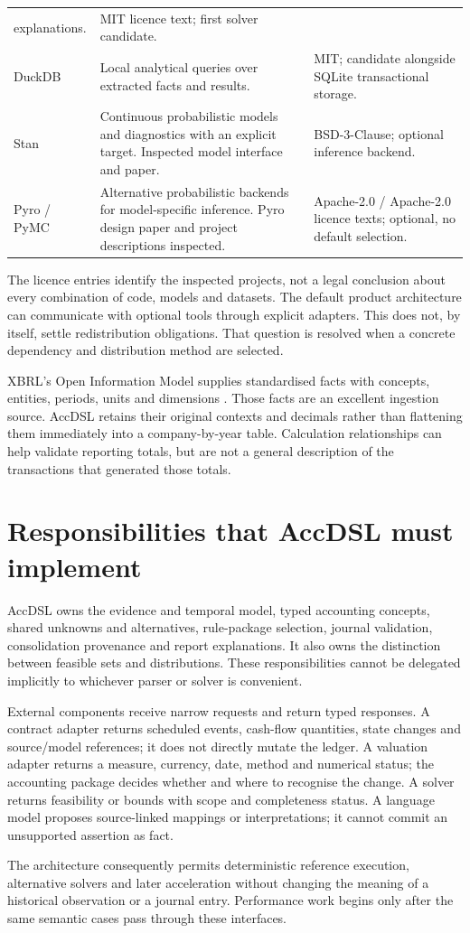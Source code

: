 \begin{longtable}{L{26mm}L{71mm}L{39mm}}
explanations. & MIT licence text; first solver candidate.\\
DuckDB & Local analytical queries over extracted facts and results. & MIT;
candidate alongside SQLite transactional storage.\\
Stan & Continuous probabilistic models and diagnostics with an explicit target.
Inspected model interface and paper. & BSD-3-Clause; optional inference backend.\\
Pyro / PyMC & Alternative probabilistic backends for model-specific inference.
Pyro design paper and project descriptions inspected. & Apache-2.0 / Apache-2.0
licence texts; optional, no default selection.\\
\bottomrule
\end{longtable}

The licence entries identify the inspected projects, not a legal conclusion
about every combination of code, models and datasets. The default product
architecture can communicate with optional tools through explicit adapters.
This does not, by itself, settle redistribution obligations. That question is
resolved when a concrete dependency and distribution method are selected.

XBRL's Open Information Model supplies standardised facts with concepts,
entities, periods, units and dimensions \citep{xbrloim}. Those facts are an
excellent ingestion source. AccDSL retains their original contexts and
decimals rather than flattening them immediately into a company-by-year table.
Calculation relationships can help validate reporting totals, but are not a
general description of the transactions that generated those totals.

\section{Responsibilities that AccDSL must implement}

AccDSL owns the evidence and temporal model, typed accounting concepts, shared
unknowns and alternatives, rule-package selection, journal validation,
consolidation provenance and report explanations. It also owns the distinction
between feasible sets and distributions. These responsibilities cannot be
delegated implicitly to whichever parser or solver is convenient.

External components receive narrow requests and return typed responses.
A contract adapter returns scheduled events, cash-flow quantities, state
changes and source/model references; it does not directly mutate the ledger.
A valuation adapter returns a measure, currency, date, method and numerical
status; the accounting package decides whether and where to recognise the
change. A solver returns feasibility or bounds with scope and completeness
status. A language model proposes source-linked mappings or interpretations;
it cannot commit an unsupported assertion as fact.

The architecture consequently permits deterministic reference execution,
alternative solvers and later acceleration without changing the meaning of a
historical observation or a journal entry. Performance work begins only after
the same semantic cases pass through these interfaces.
